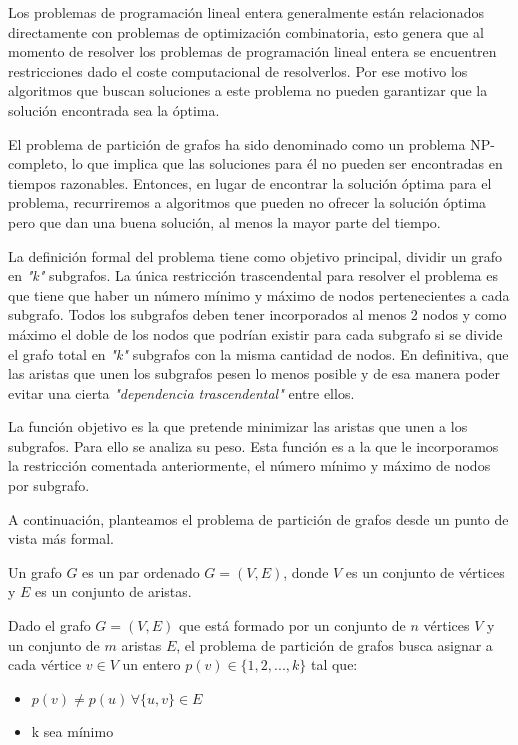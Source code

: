 Los problemas de programación lineal entera generalmente están relacionados directamente con problemas de optimización combinatoria, esto genera que al momento de resolver los problemas de programación lineal entera se encuentren restricciones dado el coste computacional de resolverlos. Por ese motivo los algoritmos que buscan soluciones a este problema no pueden garantizar que la solución encontrada sea la óptima. 

El problema de partición de grafos ha sido denominado como un problema NP-completo\cite{NPCompleteness}, lo que implica que las soluciones para él no pueden ser encontradas en tiempos razonables. Entonces, en lugar de encontrar la solución óptima para el problema, recurriremos a algoritmos que pueden no ofrecer la solución óptima pero que dan una buena solución, al menos la mayor parte del tiempo.

La definición formal del problema tiene como objetivo principal, dividir un grafo en \textit{"k"} subgrafos. La única restricción trascendental para resolver el problema es que tiene que haber un número mínimo y máximo de nodos pertenecientes a cada subgrafo. Todos los subgrafos deben tener incorporados al menos 2 nodos y como máximo el doble de los nodos que podrían existir para cada subgrafo si se divide el grafo total en \textit{"k"} subgrafos con la misma cantidad de nodos. En definitiva, que las aristas que unen los subgrafos pesen lo menos posible y de esa manera poder evitar una cierta \textit{"dependencia trascendental"} entre ellos.

La función objetivo es la que pretende minimizar las aristas que unen a los subgrafos. Para ello se analiza su peso. Esta función es a la que le incorporamos la restricción comentada anteriormente, el número mínimo y máximo de nodos por subgrafo.

A continuación, planteamos el problema de partición de grafos desde un punto de vista más formal.

\begin{mydef}\label{def:grafo}
	Un grafo $G$ es un par ordenado $G = (V, E)$, donde $V$ es un conjunto de vértices y $E$ es un conjunto de aristas.
\end{mydef}

Dado el grafo $G = (V, E)$ que está formado por un conjunto de $n$ vértices $V$ y un conjunto de $m$ aristas $E$, el problema de partición de grafos busca asignar a cada vértice $v \in V$ un entero $p(v) \in \{1, 2, ..., k\}$ tal que:

\begin{itemize}
	\item $p(v) \neq p(u) \, \forall\{u, v\} \in E$
	\item k sea mínimo
\end{itemize}

